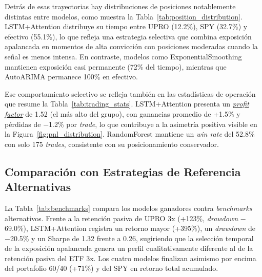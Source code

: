 Detr\'as de esas trayectorias hay distribuciones de posiciones notablemente distintas entre modelos, como muestra la Tabla~\ref{tab:position_distribution}. LSTM+Attention distribuye su tiempo entre UPRO (12.2\%), SPY (32.7\%) y efectivo (55.1\%), lo que refleja una estrategia selectiva que combina exposici\'on apalancada en momentos de alta convicci\'on con posiciones moderadas cuando la se\~nal es menos intensa. En contraste, modelos como ExponentialSmoothing mantienen exposici\'on casi permanente (72\% del tiempo), mientras que AutoARIMA permanece 100\% en efectivo.

Ese comportamiento selectivo se refleja tambi\'en en las estad\'isticas de operaci\'on que resume la Tabla~\ref{tab:trading_stats}. LSTM+Attention presenta un \hyperlink{glos:profit_factor}{\textit{profit factor}} de 1.52 (el m\'as alto del grupo), con ganancias promedio de +1.5\% y p\'erdidas de $-$1.2\% por \textit{trade}, lo que contribuye a la asimetr\'ia positiva visible en la Figura~\ref{fig:pnl_distribution}. RandomForest mantiene un \textit{win rate} del 52.8\% con solo 175 \textit{trades}, consistente con su posicionamiento conservador.

\subsection{Comparaci\'on con Estrategias de Referencia Alternativas}
\label{subsec:additional_benchmarks}

La Tabla~\ref{tab:benchmarks} compara los modelos ganadores contra \textit{benchmarks} alternativos. Frente a la retenci\'on pasiva de UPRO 3x (+123\%, \textit{drawdown} $-$69.0\%), LSTM+Attention registra un retorno mayor (+395\%), un \textit{drawdown} de $-$20.5\% y un Sharpe de 1.32 frente a 0.26, sugiriendo que la selecci\'on temporal de la exposici\'on apalancada genera un perfil cualitativamente diferente al de la retenci\'on pasiva del ETF 3x. Los cuatro modelos finalizan asimismo por encima del portafolio 60/40 (+71\%) y del SPY en retorno total acumulado.

